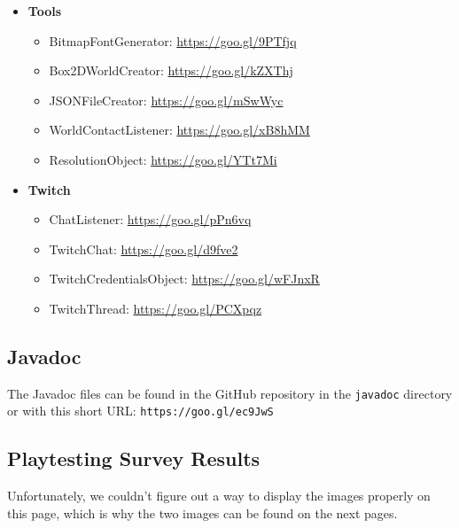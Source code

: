 \documentclass[12p]{article}
\begin{document}
\begin{itemize}
  \item \textbf{Tools}
  \begin{itemize}
    \item BitmapFontGenerator: \url{https://goo.gl/9PTfjq}
    \item Box2DWorldCreator: \url{https://goo.gl/kZXThj}
    \item JSONFileCreator: \url{https://goo.gl/mSwWyc}
    \item WorldContactListener: \url{https://goo.gl/xB8hMM}
    \item ResolutionObject: \url{https://goo.gl/YTt7Mi}
  \end{itemize}
  
  \item \textbf{Twitch}
  \begin{itemize}
    \item ChatListener: \url{https://goo.gl/pPn6vq}
    \item TwitchChat: \url{https://goo.gl/d9fve2}
    \item TwitchCredentialsObject: \url{https://goo.gl/wFJnxR}
    \item TwitchThread: \url{https://goo.gl/PCXpqz}
  \end{itemize}
\end{itemize}


\subsection{Javadoc} \label{Javadoc}

The Javadoc files can be found in the GitHub repository in the \texttt{javadoc} directory or with this short URL: \texttt{https://goo.gl/ec9JwS}


\subsection{Playtesting Survey Results} \label{SurveyResults}

Unfortunately, we couldn't figure out a way to display the images properly on this page, which is why the two images can be found on the next pages.
\end{document}
